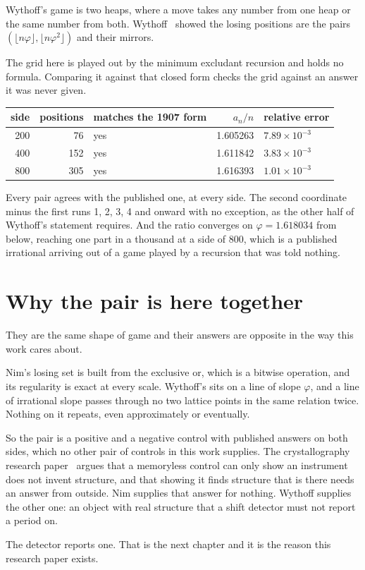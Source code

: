 Wythoff's game is two heaps, where a move takes any number from one heap or the same number from
both. Wythoff~\cite{src:Wythoff-1907} showed the losing positions are the pairs
\(\left(\lfloor n\varphi \rfloor, \lfloor n\varphi^{2} \rfloor\right)\) and their mirrors.

The grid here is played out by the minimum excludant recursion and holds no formula. Comparing it
against that closed form checks the grid against an answer it was never given.

\begin{center}
\begin{tabular}{@{}rrlrl@{}}
\toprule
side & positions & matches the 1907 form & \(a_n/n\) & relative error \\
\midrule
200 & 76 & yes & 1.605263 & \(7.89\times10^{-3}\) \\
400 & 152 & yes & 1.611842 & \(3.83\times10^{-3}\) \\
800 & 305 & yes & 1.616393 & \(1.01\times10^{-3}\) \\
\bottomrule
\end{tabular}
\end{center}

Every pair agrees with the published one, at every side. The second coordinate minus the first runs
1, 2, 3, 4 and onward with no exception, as the other half of Wythoff's statement requires. And the
ratio converges on \(\varphi = 1.618034\) from below, reaching one part in a thousand at a side of
800, which is a published irrational arriving out of a game played by a recursion that was told
nothing.

\section{Why the pair is here together}

They are the same shape of game and their answers are opposite in the way this work cares about.

Nim's losing set is built from the exclusive or, which is a bitwise operation, and its regularity is
exact at every scale. Wythoff's sits on a line of slope \(\varphi\), and a line of irrational slope
passes through no two lattice points in the same relation twice. Nothing on it repeats, even
approximately or eventually.

So the pair is a positive and a negative control with published answers on both sides, which no
other pair of controls in this work supplies. The crystallography research paper~\cite{src:Quigg-crystallography} argues that a memoryless control
can only show an instrument does not invent structure, and that showing it finds structure that is
there needs an answer from outside. Nim supplies that answer for nothing. Wythoff supplies the other
one: an object with real structure that a shift detector must not report a period on.

The detector reports one. That is the next chapter and it is the reason this research paper exists.
